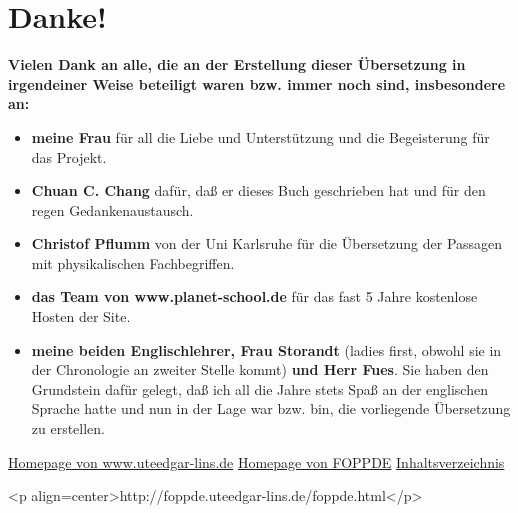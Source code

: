 
\chapter{Danke!}
\label{Danke}

\textbf{Vielen Dank an alle, die an der Erstellung dieser Übersetzung in irgendeiner Weise beteiligt waren bzw. immer noch sind, insbesondere an:}

\begin{itemize} 
 \item \textbf{meine Frau} für all die Liebe und Unterstützung und die Begeisterung für das Projekt.
 \item \textbf{Chuan C. Chang} dafür, daß er dieses Buch geschrieben hat und für den regen Gedankenaustausch.
 \item \textbf{Christof Pflumm} von der Uni Karlsruhe für die Übersetzung der Passagen mit physikalischen Fachbegriffen.
 \item \textbf{das Team von www.planet-school.de} für das fast 5 Jahre kostenlose Hosten der Site.
 \item \textbf{meine beiden Englischlehrer, Frau Storandt} (ladies first, obwohl sie in der Chronologie an zweiter Stelle kommt) \textbf{und Herr Fues}.
Sie haben den Grundstein dafür gelegt, daß ich all die Jahre stets Spaß an der englischen Sprache hatte und nun in der Lage war bzw. bin, die vorliegende Übersetzung zu erstellen.
\end{itemize}






\label{kontakt}


\label{mailel}




\href{http://www.uteedgar-lins.de/index.html}{Homepage von www.uteedgar-lins.de} 
\href{./index.html}{Homepage von FOPPDE} 
\hyperref[Inhalt]{Inhaltsverzeichnis} 


<p align=center>http://foppde.uteedgar-lins.de/foppde.html</p>

